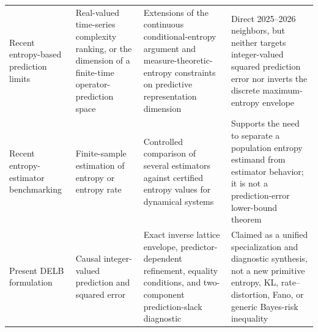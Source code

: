 \begin{table}[!t]
\begin{tabularx}{\textwidth}{
    >{\RaggedRight\arraybackslash}p{}
    >{\RaggedRight\arraybackslash}p{}
    >{\RaggedRight\arraybackslash}p{}
    >{\RaggedRight\arraybackslash}X}
Recent entropy-based prediction limits
\citep{ayers2025complexity,hauser2026dmd}
& Real-valued time-series complexity ranking, or the dimension of a
finite-time operator-prediction space
& Extensions of the continuous conditional-entropy argument and
measure-theoretic-entropy constraints on predictive representation dimension
& Direct 2025--2026 neighbors, but neither targets integer-valued squared
prediction error nor inverts the discrete maximum-entropy envelope\\

Recent entropy-estimator benchmarking
\citep{calcagnile2026benchmark}
& Finite-sample estimation of entropy or entropy rate
& Controlled comparison of several estimators against certified entropy
values for dynamical systems
& Supports the need to separate a population entropy estimand from estimator
behavior; it is not a prediction-error lower-bound theorem\\

Present DELB formulation
& Causal integer-valued prediction and squared error
& Exact inverse lattice envelope, predictor-dependent refinement, equality
conditions, and two-component prediction-slack diagnostic
& Claimed as a unified specialization and diagnostic synthesis, not a new
primitive entropy, KL, rate--distortion, Fano, or generic Bayes-risk
inequality\\
\bottomrule
\end{tabularx}
\end{table}
